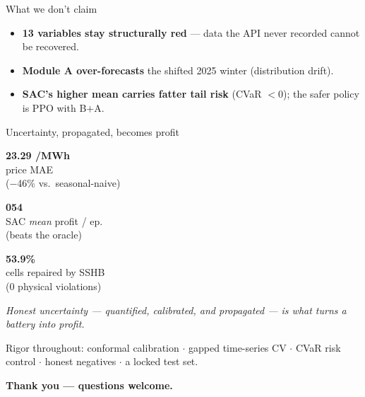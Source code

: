 \documentclass[aspectratio=169,11pt]{beamer}
\newcommand{\eur}{\texteuro}
\newcommand{\statcard}[3]{%
  \colorbox{#1!12}{\parbox[t][2.4cm][c]{0.30\textwidth}{\centering
    {\Large\bfseries\color{#1} #2}\\[3pt]{\footnotesize\color{emisInk} #3}}}}
\begin{document}
\begin{frame}{What we don't claim}
  \vspace{0.2cm}
  \begin{itemize}\setlength\itemsep{10pt}
    \item \textbf{13 variables stay structurally red} --- data the API never recorded cannot be recovered.
    \item \textbf{Module A over-forecasts} the shifted 2025 winter (distribution drift).
    \item \textbf{SAC's higher mean carries fatter tail risk} (CVaR $<0$); the safer policy is PPO with B$+$A.
  \end{itemize}
\end{frame}

\begin{frame}{Uncertainty, propagated, becomes profit}
  \vspace{0.25cm}
  \centering
  \statcard{modB}{23.29 \eur/MWh}{price MAE\\($-$46\% vs.\ seasonal-naive)}\hfill
  \statcard{modC}{\eur13{,}054}{SAC \emph{mean} profit / ep.\\(beats the oracle)}\hfill
  \statcard{modImp}{53.9\%}{cells repaired by SSHB\\(0 physical violations)}
  \vspace{0.5cm}

  \begin{center}\itshape\small
    Honest uncertainty --- quantified, calibrated, and propagated --- is what turns a
    battery into profit.
  \end{center}
  \vspace{0.25cm}
  {\footnotesize\color{emisMuted}\centering
   Rigor throughout: conformal calibration $\cdot$ gapped time-series CV $\cdot$ CVaR risk control $\cdot$ honest negatives $\cdot$ a locked test set.\par}
  \vspace{0.35cm}
  \begin{center}{\color{emisAccent}\bfseries Thank you --- questions welcome.}\end{center}
\end{frame}
\end{document}
